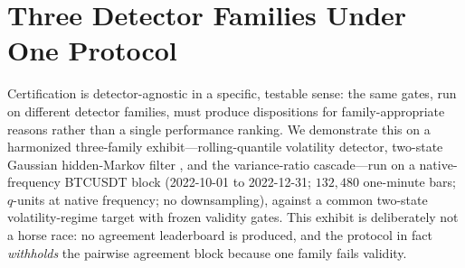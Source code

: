 \documentclass[3p]{elsarticle}
\begin{document}
\section{Three Detector Families Under One Protocol}
\label{sec:families}

Certification is detector-agnostic in a specific, testable sense: the same
gates, run on different detector families, must produce dispositions for
family-appropriate reasons rather than a single performance ranking. We
demonstrate this on a harmonized three-family exhibit---rolling-quantile
volatility detector, two-state Gaussian hidden-Markov filter
\citep{Hamilton1989}, and the variance-ratio cascade---run on a native-frequency
BTCUSDT block (2022-10-01 to 2022-12-31; $132{,}480$ one-minute bars;
$q$-units at native frequency; no downsampling), against a common two-state
volatility-regime target with frozen validity gates. This exhibit is
deliberately not a horse race: no agreement leaderboard is produced, and the
protocol in fact \emph{withholds} the pairwise agreement block because one
family fails validity.
\end{document}
